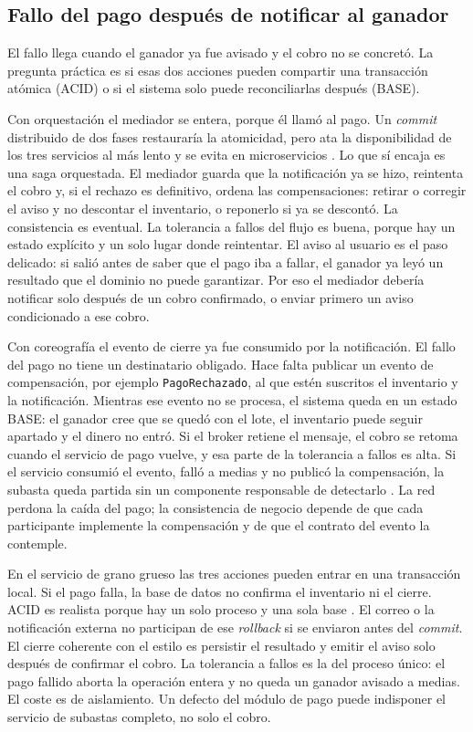 \subsection{Fallo del pago después de notificar al ganador}
El fallo llega cuando el ganador ya fue avisado y el cobro no se concretó. La pregunta práctica es si esas dos acciones pueden compartir una transacción atómica (ACID) o si el sistema solo puede reconciliarlas después (BASE).

Con orquestación el mediador se entera, porque él llamó al pago. Un \emph{commit} distribuido de dos fases restauraría la atomicidad, pero ata la disponibilidad de los tres servicios al más lento y se evita en microservicios \parencite{ford2021hard}. Lo que sí encaja es una saga orquestada. El mediador guarda que la notificación ya se hizo, reintenta el cobro y, si el rechazo es definitivo, ordena las compensaciones: retirar o corregir el aviso y no descontar el inventario, o reponerlo si ya se descontó. La consistencia es eventual. La tolerancia a fallos del flujo es buena, porque hay un estado explícito y un solo lugar donde reintentar. El aviso al usuario es el paso delicado: si salió antes de saber que el pago iba a fallar, el ganador ya leyó un resultado que el dominio no puede garantizar. Por eso el mediador debería notificar solo después de un cobro confirmado, o enviar primero un aviso condicionado a ese cobro.

Con coreografía el evento de cierre ya fue consumido por la notificación. El fallo del pago no tiene un destinatario obligado. Hace falta publicar un evento de compensación, por ejemplo \texttt{PagoRechazado}, al que estén suscritos el inventario y la notificación. Mientras ese evento no se procesa, el sistema queda en un estado BASE: el ganador cree que se quedó con el lote, el inventario puede seguir apartado y el dinero no entró. Si el broker retiene el mensaje, el cobro se retoma cuando el servicio de pago vuelve, y esa parte de la tolerancia a fallos es alta. Si el servicio consumió el evento, falló a medias y no publicó la compensación, la subasta queda partida sin un componente responsable de detectarlo \parencite{richards2020fundamentals}. La red perdona la caída del pago; la consistencia de negocio depende de que cada participante implemente la compensación y de que el contrato del evento la contemple.

En el servicio de grano grueso las tres acciones pueden entrar en una transacción local. Si el pago falla, la base de datos no confirma el inventario ni el cierre. ACID es realista porque hay un solo proceso y una sola base \parencite{richards2020fundamentals}. El correo o la notificación externa no participan de ese \emph{rollback} si se enviaron antes del \emph{commit}. El cierre coherente con el estilo es persistir el resultado y emitir el aviso solo después de confirmar el cobro. La tolerancia a fallos es la del proceso único: el pago fallido aborta la operación entera y no queda un ganador avisado a medias. El coste es de aislamiento. Un defecto del módulo de pago puede indisponer el servicio de subastas completo, no solo el cobro.

